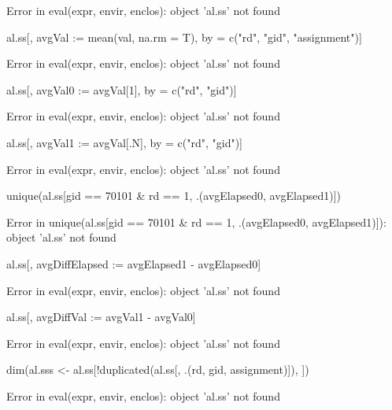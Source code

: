 \begin{Schunk}
\begin{Sinput}
\end{Sinput}
\begin{Soutput}
Error in eval(expr, envir, enclos): object 'al.ss' not found
\end{Soutput}
\begin{Sinput}
al.ss[, avgVal := mean(val, na.rm = T), by = c("rd", "gid", "assignment")]
\end{Sinput}
\begin{Soutput}
Error in eval(expr, envir, enclos): object 'al.ss' not found
\end{Soutput}
\begin{Sinput}
al.ss[, avgVal0 := avgVal[1], by = c("rd", "gid")]
\end{Sinput}
\begin{Soutput}
Error in eval(expr, envir, enclos): object 'al.ss' not found
\end{Soutput}
\begin{Sinput}
al.ss[, avgVal1 := avgVal[.N], by = c("rd", "gid")]
\end{Sinput}
\begin{Soutput}
Error in eval(expr, envir, enclos): object 'al.ss' not found
\end{Soutput}
\begin{Sinput}
unique(al.ss[gid == 70101 & rd == 1, .(avgElapsed0, avgElapsed1)])
\end{Sinput}
\begin{Soutput}
Error in unique(al.ss[gid == 70101 & rd == 1, .(avgElapsed0, avgElapsed1)]): object 'al.ss' not found
\end{Soutput}
\begin{Sinput}
al.ss[, avgDiffElapsed := avgElapsed1 - avgElapsed0]
\end{Sinput}
\begin{Soutput}
Error in eval(expr, envir, enclos): object 'al.ss' not found
\end{Soutput}
\begin{Sinput}
al.ss[, avgDiffVal := avgVal1 - avgVal0]
\end{Sinput}
\begin{Soutput}
Error in eval(expr, envir, enclos): object 'al.ss' not found
\end{Soutput}
\begin{Sinput}
dim(al.sss <- al.ss[!duplicated(al.ss[, .(rd, gid, assignment)]), ])
\end{Sinput}
\begin{Soutput}
Error in eval(expr, envir, enclos): object 'al.ss' not found
\end{Soutput}
\end{Schunk}
